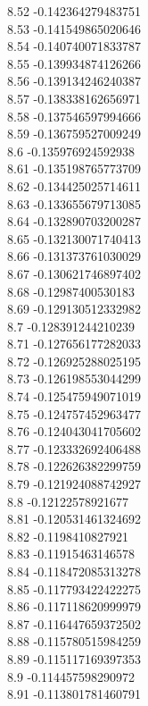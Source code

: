 {8.52	-0.142364279483751\\
8.53	-0.141549865020646\\
8.54	-0.140740071833787\\
8.55	-0.139934874126266\\
8.56	-0.139134246240387\\
8.57	-0.138338162656971\\
8.58	-0.137546597994666\\
8.59	-0.136759527009249\\
8.6	-0.135976924592938\\
8.61	-0.135198765773709\\
8.62	-0.134425025714611\\
8.63	-0.133655679713085\\
8.64	-0.132890703200287\\
8.65	-0.132130071740413\\
8.66	-0.131373761030029\\
8.67	-0.130621746897402\\
8.68	-0.12987400530183\\
8.69	-0.129130512332982\\
8.7	-0.128391244210239\\
8.71	-0.127656177282033\\
8.72	-0.126925288025195\\
8.73	-0.126198553044299\\
8.74	-0.125475949071019\\
8.75	-0.124757452963477\\
8.76	-0.124043041705602\\
8.77	-0.123332692406488\\
8.78	-0.122626382299759\\
8.79	-0.121924088742927\\
8.8	-0.12122578921677\\
8.81	-0.120531461324692\\
8.82	-0.1198410827921\\
8.83	-0.11915463146578\\
8.84	-0.118472085313278\\
8.85	-0.117793422422275\\
8.86	-0.117118620999979\\
8.87	-0.116447659372502\\
8.88	-0.115780515984259\\
8.89	-0.115117169397353\\
8.9	-0.114457598290972\\
8.91	-0.113801781460791\\
}
